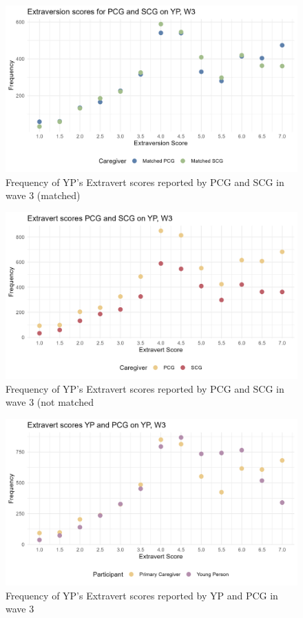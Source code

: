 \documentclass[a4paper]{article}
\begin{document}
\begin{figure}[htbp] 
    \centering
    \includegraphics[width=1\linewidth]{Matched Extravert by participant w3.jpeg}
    \caption{Frequency of YP's Extravert scores reported by PCG and SCG in wave 3 (matched)}
    \label{}
\end{figure}

\begin{figure}[htbp] 
    \centering
    \includegraphics[width=1\linewidth]{Frequency of Extravert by participant w3.jpeg}
    \caption{Frequency of YP's Extravert scores reported by PCG and SCG in wave 3 (not matched}
    \label{}
\end{figure}

\begin{figure}[htbp] 
    \centering
    \includegraphics[width=1\linewidth]{Frequency of Extravert by participant w3a.jpeg}
    \caption{Frequency of YP's Extravert scores reported by YP and PCG in wave 3}
    \label{}
\end{figure}
\end{document}
